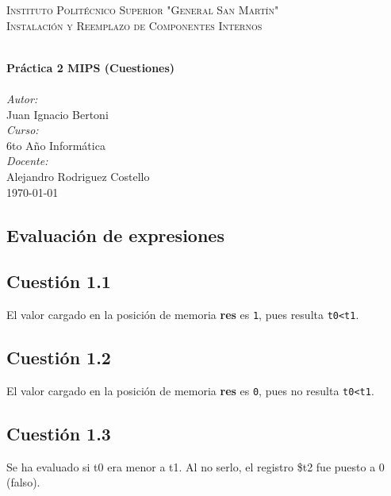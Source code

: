 \documentclass[11pt]{article}
\begin{document}
\begin{large}
\begin{titlepage}
\center 
 
\textsc{\LARGE Instituto Politécnico Superior "General San Martín"}\\[1cm]

\textsc{\Large Instalación y Reemplazo de Componentes Internos}\\[0.2cm]				
\vspace{7.5mm}

\HRule \\[0.8cm]
{ \huge \bfseries Práctica 2 MIPS (Cuestiones)}\\[0.7cm]								%
\HRule \\[2cm]
\large
\emph{Autor:}\\
Juan Ignacio Bertoni\\[1.5cm]	
\emph{Curso:}\\
6to Año Informática\\[1.5cm]	
\emph{Docente:}\\
Alejandro Rodriguez Costello\\[1.5cm]	

{\large \today}\\[5cm]
\vfill 
\end{titlepage}



\vfill

\begin{flushleft}

\section*{Evaluación de expresiones}
\subsection*{Cuestión 1.1}

El valor cargado en la posición de memoria \textbf{res} es \texttt{1}, pues resulta \texttt{t0<t1}. 

\subsection*{Cuestión 1.2}
El valor cargado en la posición de memoria \textbf{res} es \texttt{0}, pues no resulta \texttt{t0<t1}. 

\subsection*{Cuestión 1.3}
Se ha evaluado si t0 era menor a t1. Al no serlo, el registro \$t2 fue puesto a 0 (falso).


\end{flushleft}
\end{large}
\end{document}
